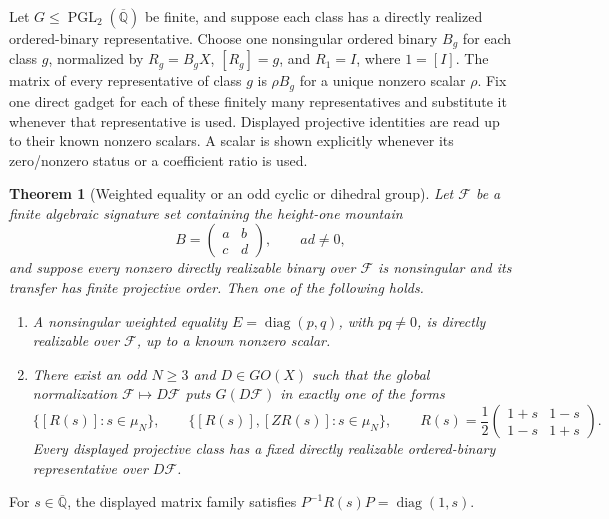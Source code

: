 \documentclass[11pt,letterpaper,onecolumn]{article}
\theoremstyle{plain}
\newtheorem{theorem}{Theorem}[section]
\theoremstyle{definition}
\theoremstyle{remark}
\newcommand{\AlgNums}{\overline{\mathbb Q}}
\newcommand{\cF}{\mathcal F}
\newcommand{\PGL}{\operatorname{PGL}}
\newcommand{\diag}{\operatorname{diag}}
\begin{document}
	Let \(G\le\PGL_2(\AlgNums)\) be finite, and suppose each class has
	a directly realized ordered-binary representative.  Choose one
	nonsingular ordered binary \(B_g\) for each class \(g\), normalized by
	\(R_g=B_gX\), \([R_g]=g\), and \(R_1=I\), where \(1=[I]\).  The matrix of
	every representative of class \(g\) is \(\rho B_g\) for a unique nonzero
	scalar \(\rho\).  Fix one direct gadget for each of these finitely many
	representatives and substitute it whenever that representative is used.
	Displayed
	projective identities are read up to their known nonzero scalars. A scalar is
	shown explicitly whenever its zero/nonzero status or a coefficient ratio is
	used.
	
	
	\begin{theorem}[Weighted equality or an odd cyclic or dihedral group]
		\label{thm:finite-group-split}
		Let \(\cF\) be a finite algebraic signature set containing the height-one
		mountain
		\[
		B=\begin{pmatrix}a&b\\c&d\end{pmatrix},
		\qquad ad\ne0,
		\]
		and suppose every nonzero directly realizable binary over \(\cF\) is
		nonsingular and its transfer has finite projective order.  Then one of the following
		holds.
		\begin{enumerate}
			\item A nonsingular weighted equality
			\(E=\diag(p,q)\), with \(pq\ne0\), is directly realizable over
			\(\cF\), up to a known nonzero scalar.
			\item There exist an odd \(N\ge3\) and \(D\in GO(X)\) such that the global normalization \(\cF\mapsto D\cF\) puts
			\(G(D\cF)\) in exactly one of the forms
			\[
			\{[R(s)]:s\in\mu_N\},
			\qquad
			\{[R(s)],[ZR(s)]:s\in\mu_N\},
			\qquad
			R(s)=\frac12
			\begin{pmatrix}1+s&1-s\\1-s&1+s\end{pmatrix}.
			\]
			Every displayed projective class has a fixed directly realizable
			ordered-binary representative over \(D\cF\).
		\end{enumerate}
	\end{theorem}

    For \(s\in\AlgNums\), the displayed matrix family satisfies
    \(P^{-1}R(s)P=\diag(1,s)\).
	
\end{document}
